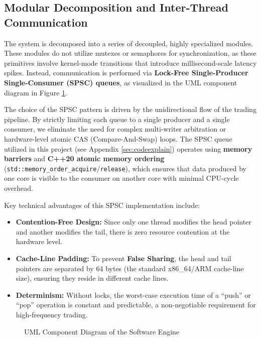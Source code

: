 \subsection{Modular Decomposition and Inter-Thread Communication}
The system is decomposed into a series of decoupled, highly specialized modules. These modules do not utilize mutexes or semaphores for synchronization, as these primitives involve kernel-mode transitions that introduce millisecond-scale latency spikes. Instead, communication is performed via \textbf{Lock-Free Single-Producer Single-Consumer (SPSC) queues}, as visualized in the UML component diagram in Figure \ref{fig:sw_class_diagram}.

The choice of the SPSC pattern is driven by the unidirectional flow of the trading pipeline. By strictly limiting each queue to a single producer and a single consumer, we eliminate the need for complex multi-writer arbitration or hardware-level atomic CAS (Compare-And-Swap) loops. The SPSC queue utilized in this project (see Appendix \ref{sec:codeexplain}) operates using \textbf{memory barriers} and \textbf{C++20 atomic memory ordering} (\texttt{std::memory\_order\_acquire}/\texttt{release}), which ensures that data produced by one core is visible to the consumer on another core with minimal CPU-cycle overhead.

Key technical advantages of this SPSC implementation include:
\begin{itemize}
    \item \textbf{Contention-Free Design:} Since only one thread modifies the head pointer and another modifies the tail, there is zero resource contention at the hardware level.
    \item \textbf{Cache-Line Padding:} To prevent \textbf{False Sharing}, the head and tail pointers are separated by 64 bytes (the standard x86\_64/ARM cache-line size), ensuring they reside in different cache lines.
    \item \textbf{Determinism:} Without locks, the worst-case execution time of a ``push'' or ``pop'' operation is constant and predictable, a non-negotiable requirement for high-frequency trading.
\end{itemize}

\begin{figure}
    \centering
    \caption{UML Component Diagram of the Software Engine}
    \label{fig:sw_class_diagram}
    
\end{figure}
\clearpage

